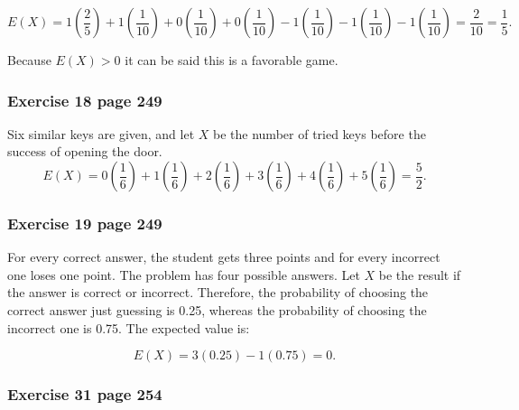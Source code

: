 \documentclass[10pt,leter,openany]{article}
\begin{document}
	\begin{equation*}
		E(X) = 1\left( \dfrac{2}{5}\right)  + 1\left( \dfrac{1}{10}\right)  + 0\left( \dfrac{1}{10}\right) + 0\left( \dfrac{1}{10}\right) -1\left( \dfrac{1}{10}\right) - 1\left( \dfrac{1}{10}\right) -1\left( \dfrac{1}{10}\right)  = \dfrac{2}{10} = \dfrac{1}{5}.
	\end{equation*}

	Because $E(X) >0$ it can be said this is a favorable game.
	
	\subsubsection*{Exercise 18 page 249}
	
	Six similar keys are given, and let $ X $ be the number of tried keys before the success of opening the door.
	\begin{equation*}
		E(X) =
		0\left( \dfrac{1}{6}\right)   + 1\left( \dfrac{1}{6}\right) +2\left( \dfrac{1}{6}\right) + 3\left( \dfrac{1}{6}\right) + 4\left( \dfrac{1}{6}\right)  +5\left( \dfrac{1}{6}\right)   = \dfrac{5}{2}.
	\end{equation*}


\subsubsection*{Exercise 19 page 249}

For every correct answer, the student gets three points and for every incorrect one loses one point. The problem has four possible answers. Let $ X $ be the result if the answer is correct or incorrect. Therefore, the probability of choosing the correct answer just guessing is 0.25, whereas the probability of choosing the incorrect one is 0.75. The expected value is:

\begin{equation*}
	E(X) = 3(0.25) -1(0.75)  = 0.
\end{equation*}

\subsubsection*{Exercise 31 page 254}
\end{document}
